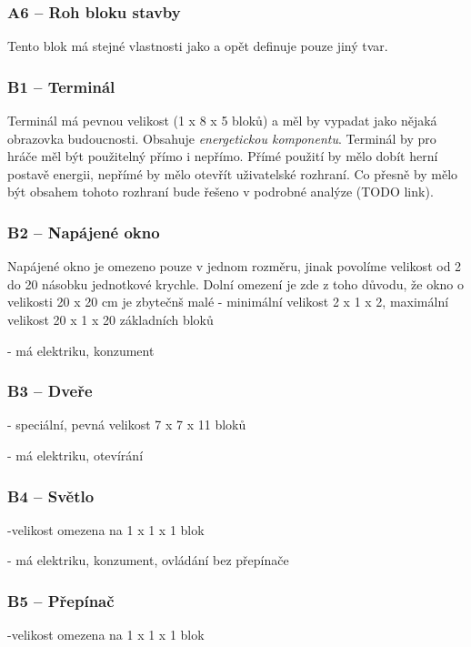\subsubsection{A6 -- Roh bloku stavby}
\label{blocks:A6}
Tento blok má stejné vlastnosti jako  a opět definuje pouze jiný tvar.


\subsubsection{B1 -- Terminál}
\label{blocks:B1}
Terminál má pevnou velikost (1 x 8 x 5 bloků) a měl by vypadat jako nějaká obrazovka budoucnosti.  Obsahuje \textit{energetickou komponentu}. Terminál by pro hráče měl být použitelný přímo i nepřímo. Přímé použití by mělo dobít herní postavě energii, nepřímé by mělo otevřít uživatelské rozhraní. Co přesně by mělo být obsahem tohoto rozhraní bude řešeno v podrobné analýze (TODO link).

\subsubsection{B2 -- Napájené okno}
\label{blocks:B2}
Napájené okno je omezeno pouze v jednom rozměru, jinak povolíme velikost od 2 do 20 násobku jednotkové krychle. Dolní omezení je zde z toho důvodu, že okno o velikosti 20 x 20 cm je zbytečnš malé
- minimální velikost 2 x 1 x 2, maximální velikost 20 x 1 x 20 základních bloků

- má elektriku, konzument


\subsubsection{B3 -- Dveře}
\label{blocks:B3}
- speciální, pevná velikost 7 x 7 x 11 bloků

- má elektriku, otevírání


\subsubsection{B4 -- Světlo}
\label{blocks:B4}
-velikost omezena na 1 x 1 x 1 blok

- má elektriku, konzument, ovládání bez přepínače


\subsubsection{B5 -- Přepínač}
\label{blocks:B5}
-velikost omezena na 1 x 1 x 1 blok

